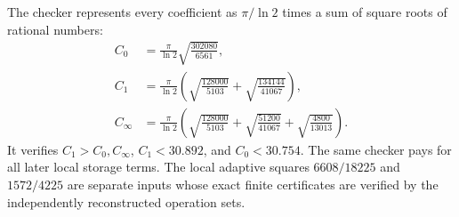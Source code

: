 \documentclass[11pt]{article}
\theoremstyle{remark}\newtheorem{remark}[theorem]{Remark}
\begin{document}
The checker represents every coefficient as $\pi/\ln2$ times a sum of
square roots of rational numbers:
\begin{align*}
 C_0&=\frac\pi{\ln2}\sqrt{\frac{302080}{6561}},\\
 C_1&=\frac\pi{\ln2}
 \left(\sqrt{\frac{128000}{5103}}+\sqrt{\frac{134144}{41067}}\right),\\
 C_\infty&=\frac\pi{\ln2}
 \left(\sqrt{\frac{128000}{5103}}+\sqrt{\frac{51200}{41067}}
       +\sqrt{\frac{4800}{13013}}\right).
\end{align*}
It verifies $C_1>C_0,C_\infty$, $C_1<30.892$, and $C_0<30.754$.
The same checker pays for all later local storage terms. The local adaptive
squares $6608/18225$ and $1572/4225$ are separate inputs whose exact finite
certificates are verified by the independently reconstructed operation sets.
\end{document}
